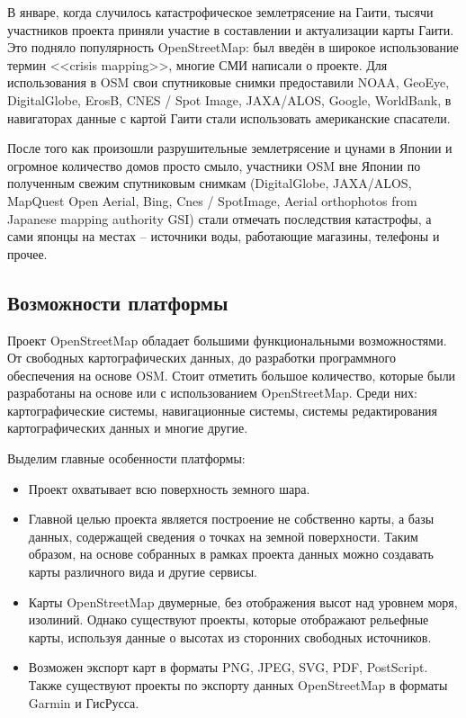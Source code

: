 В январе, когда случилось катастрофическое землетрясение на Гаити, тысячи 
участников проекта приняли участие в составлении и актуализации карты Гаити. 
Это подняло популярность OpenStreetMap: был введён в широкое использование 
термин <<crisis mapping>>, многие СМИ написали о проекте. Для использования в 
OSM свои спутниковые снимки предоставили NOAA, GeoEye, DigitalGlobe, ErosB, 
CNES / Spot Image, JAXA/ALOS, Google, WorldBank, в навигаторах данные с картой 
Гаити стали использовать американские спасатели.

После того как произошли разрушительные землетрясение и цунами в Японии и 
огромное количество домов просто смыло, участники OSM вне Японии по полученным 
свежим спутниковым снимкам (DigitalGlobe, JAXA/ALOS, MapQuest Open Aerial, 
Bing, Cnes / SpotImage, Aerial orthophotos from Japanese mapping authority 
GSI) стали отмечать последствия катастрофы, а сами японцы на местах -- 
источники воды, работающие магазины, телефоны и прочее.\cite{osmwiki}

\subsection{Возможности платформы}
Проект OpenStreetMap обладает большими функциональными возможностями. От 
свободных картографических данных, до разработки программного обеспечения на 
основе OSM. Стоит отметить большое количество, которые были разработаны на 
основе или с использованием OpenStreetMap. Среди них: картографические 
системы, навигационные системы, системы редактирования картографических данных 
и многие другие.\cite{osmwiki}

Выделим главные особенности платформы:
\begin{itemize}
    \item Проект охватывает всю поверхность земного шара.
    \item Главной целью проекта является построение не собственно карты, а 
        базы данных, содержащей сведения о точках на земной поверхности. Таким 
        образом, на основе собранных в рамках проекта данных можно создавать 
        карты различного вида и другие сервисы.
    \item Карты OpenStreetMap двумерные, без отображения высот над уровнем 
        моря, изолиний. Однако существуют проекты, которые отображают 
        рельефные карты, используя данные о высотах из сторонних свободных 
        источников.
    \item Возможен экспорт карт в форматы PNG, JPEG, SVG, PDF, PostScript. 
        Также существуют проекты по экспорту данных OpenStreetMap в форматы 
        Garmin и ГисРусса.
\end{itemize}

